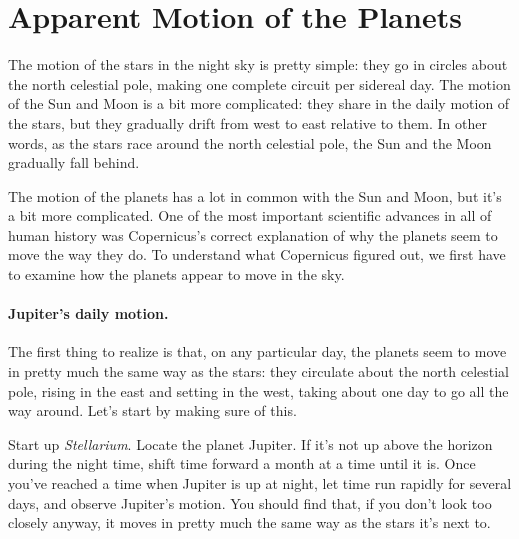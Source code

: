 \section{Apparent Motion of the Planets}

\makelabheader

\bigskip

The motion of the stars in the night sky is pretty simple: they
go in circles about the north celestial pole, making one complete
circuit per sidereal day. The motion of the Sun and Moon is a bit
more complicated: they share in the daily motion of the stars, but
they gradually drift from west to east relative to them. In other words,
as the stars race around the north celestial pole, the Sun
and the Moon gradually fall behind.

The motion of the planets has a lot in common with the Sun and Moon,
but it's a bit more complicated. One of the most important scientific
advances in all of human history was Copernicus's correct
explanation of why the planets seem to move the way they do. 
To understand what Copernicus figured out, we first have
to examine how the planets appear to move in the sky.

\bigskip

\paragraph{Jupiter's daily motion.}
The first thing to realize is that, on any particular day, the
planets seem to move in pretty much the same way as the stars: they
circulate about the north celestial pole, rising in the east and setting
in the west, taking about one day to go all the way around. Let's start
by making sure of this.

Start up \textit{Stellarium}.
Locate the planet Jupiter. If it's not up above the horizon during the night
time, shift time forward a month at a time until it is. Once you've
reached a time when Jupiter is up at night, let
time run rapidly for several days, 
and observe Jupiter's motion. You
should find that, if you don't look too closely anyway, it moves in
pretty much the same way as the stars it's next to.

\medskip

